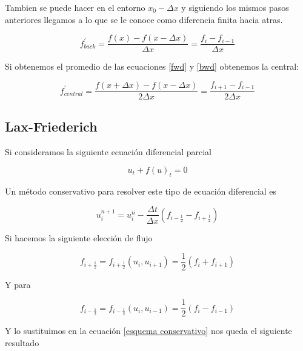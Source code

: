 \documentclass[12pt,a4paper]{book}
\begin{document}
Tambien se puede hacer en el entorno $x_0- \Delta x$ y siguiendo los mismos pasos anteriores llegamos a lo que se le conoce como diferencia finita hacia atras.



\begin{equation}\label{bwd}
f_{back}^{'}=\frac{f\left(x \right) - f(x - \Delta x) }{\Delta x}=\frac{f_{i}-f_{i-1}}{\Delta x}
\end{equation}

Si obtenemos el promedio de las ecuaciones \ref{fwd} y \ref{bwd} obtenemos la central:

\begin{equation} \label{Centrada}
f_{central}^{'}=\frac{f\left(x + \Delta x\right) - f(x - \Delta x) }{2\Delta x}=\frac{f_{i+1}-f_{i-1}}{2 \Delta x}
\end{equation}



\subsection{Lax-Friederich}

Si consideramos la siguiente ecuación diferencial parcial

\begin{equation} \label{ecu_conser}
u_t+ f\left(u \right)_t=0
\end{equation}

Un método conservativo para resolver este tipo de ecuación diferencial es 

\begin{equation}\label{esquema conservativo}
u_i^{n+1} = u_i^{n} -\frac{\Delta t}{\Delta x} \left(f_{i-\frac{1}{2}} - f_{i+\frac{1}{2}}\right)
\end{equation}



Si hacemos la siguiente elección de flujo 

\begin{equation}
f_{i+\frac{1}{2}} = f_{i+\frac{1}{2}} \left(
u_{i} , u_{i+1}\right) =\frac{1}{2} \left(f_{i} + f_{i+1} \right) 
\end{equation}

Y para 

\begin{equation}
f_{i-\frac{1}{2}} = f_{i-\frac{1}{2}} \left(
u_{i} , u_{i-1}\right) =\frac{1}{2} \left(f_{i} - f_{i-1} \right) 
\end{equation}

Y lo sustituimos en la ecuación \ref{esquema conservativo} nos queda el siguiente resultado
\end{document}
